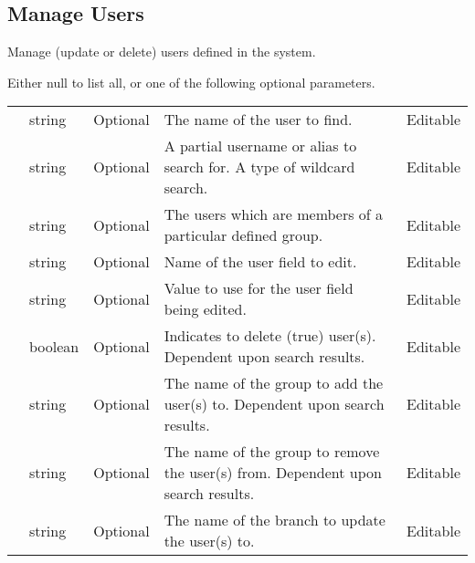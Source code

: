 \documentclass[letterpaper,10pt,english]{sphinxmanual}
\begin{document}
\subsection{Manage Users}
\label{\detokenize{soapapi:manage-users}}
 

 Manage (update or delete) users defined in the system.

 Either null to list all, or one of the following optional parameters.


\begin{savenotes}\sphinxattablestart
\centering
\begin{tabulary}{\linewidth}[t]{|T|T|T|T|T|}
\hline

&
&
&
&
\\
\hline
{}
&
string
&
Optional
&
The name of the user to find.
&
Editable
\\
\hline
{}
&
string
&
Optional
&
A partial username or alias to search for. A type of wildcard search.
&
Editable
\\
\hline
{}
&
string
&
Optional
&
The users which are members of a particular defined group.
&
Editable
\\
\hline
{}
&
string
&
Optional
&
Name of the user field to edit.
&
Editable
\\
\hline
{}
&
string
&
Optional
&
Value to use for the user field being edited.
&
Editable
\\
\hline
{}
&
boolean
&
Optional
&
Indicates to delete (true) user(s). Dependent upon search results.
&
Editable
\\
\hline
{}
&
string
&
Optional
&
The name of the group to add the user(s) to. Dependent upon search results.
&
Editable
\\
\hline
{}
&
string
&
Optional
&
The name of the group to remove the user(s) from. Dependent upon search results.
&
Editable
\\
\hline
{}
&
string
&
Optional
&
The name of the branch to update the user(s) to.
&
Editable
\\
\hline
\end{tabulary}
\par
\sphinxattableend\end{savenotes}
\end{document}

